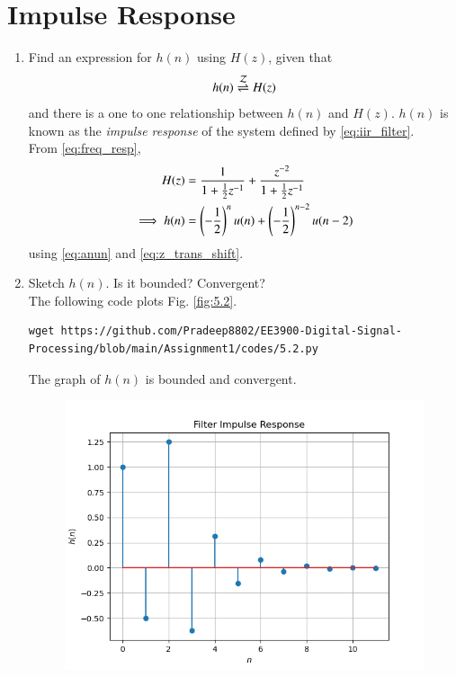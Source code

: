 \documentclass[journal,12pt,twocolumn]{IEEEtran}
\renewcommand\thesection{\arabic{section}}
\begin{document}
\section{Impulse Response}
\begin{enumerate}[label=\thesection.\arabic*]
\item \label{prob:impulse_resp}
Find an expression for $h(n)$ using $H(z)$, given that 
\begin{equation}
\label{eq:impulse_resp}
h(n) \overset{\mathcal{Z}}{ \rightleftharpoons} H(z)
\end{equation}
and there is a one to one relationship between $h(n)$ and $H(z)$. $h(n)$ is known as the {\em impulse response} of the
system defined by \eqref{eq:iir_filter}.
\\
\solution From \eqref{eq:freq_resp},
\begin{align}
H(z) &= \frac{1}{1 + \frac{1}{2}z^{-1}} + \frac{ z^{-2}}{1 + \frac{1}{2}z^{-1}}
\\
\implies h(n) &= \left(-\frac{1}{2}\right)^{n}u(n) + \left(-\frac{1}{2}\right)^{n-2}u(n-2)
\end{align}
using \eqref{eq:anun} and \eqref{eq:z_trans_shift}.
\item Sketch $h(n)$. Is it bounded? Convergent? 
\\
\solution The following code plots Fig. \ref{fig:5.2}.
\begin{lstlisting}
wget https://github.com/Pradeep8802/EE3900-Digital-Signal-Processing/blob/main/Assignment1/codes/5.2.py
\end{lstlisting}
The graph of $h(n)$ is bounded and convergent.
\begin{figure}[!ht]
\centering
\includegraphics[width=\columnwidth]{./figs/5.2}

\end{figure}
\end{enumerate}
\end{document}
